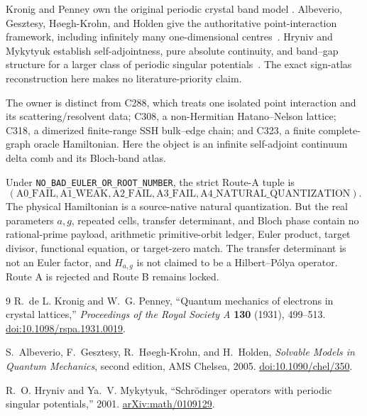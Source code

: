 \documentclass[10pt]{article}
\begin{document}
Kronig and Penney own the original periodic crystal band model
\cite{kronigpenney}.  Albeverio, Gesztesy, H\o egh-Krohn, and Holden give the
authoritative point-interaction framework, including infinitely many
one-dimensional centres~\cite{albeverio}.  Hryniv and Mykytyuk establish
self-adjointness, pure absolute continuity, and band--gap structure for a
larger class of periodic singular potentials~\cite{hryniv}.  The exact
sign-atlas reconstruction here makes no literature-priority claim.

The owner is distinct from C288, which treats one isolated point interaction
and its scattering/resolvent data; C308, a non-Hermitian Hatano--Nelson
lattice; C318, a dimerized finite-range SSH bulk--edge chain; and C323, a
finite complete-graph oracle Hamiltonian.  Here the object is an infinite
self-adjoint continuum delta comb and its Bloch-band atlas.

Under \texttt{NO\_BAD\_EULER\_OR\_ROOT\_NUMBER}, the strict Route-A tuple is
\[
 (\mathrm{A0\_FAIL},\mathrm{A1\_WEAK},\mathrm{A2\_FAIL},
  \mathrm{A3\_FAIL},\mathrm{A4\_NATURAL\_QUANTIZATION}).
\]
The physical Hamiltonian is a source-native natural quantization.  But the
real parameters $a,g$, repeated cells, transfer determinant, and Bloch phase
contain no rational-prime payload, arithmetic primitive-orbit ledger, Euler
product, target divisor, functional equation, or target-zero match.  The
transfer determinant is not an Euler factor, and $H_{a,g}$ is not claimed to
be a Hilbert--P\'olya operator.  Route A is rejected and Route B remains
locked.

\begingroup\small
\begin{thebibliography}{9}
R.~de L. Kronig and W.~G. Penney,
``Quantum mechanics of electrons in crystal lattices,''
\emph{Proceedings of the Royal Society A} \textbf{130} (1931), 499--513.
\href{https://doi.org/10.1098/rspa.1931.0019}{doi:10.1098/rspa.1931.0019}.

S.~Albeverio, F.~Gesztesy, R.~H\o egh-Krohn, and H.~Holden,
\emph{Solvable Models in Quantum Mechanics}, second edition,
AMS Chelsea, 2005.
\href{https://doi.org/10.1090/chel/350}{doi:10.1090/chel/350}.

R.~O. Hryniv and Ya.~V. Mykytyuk,
``Schr\"odinger operators with periodic singular potentials,'' 2001.
\href{https://arxiv.org/abs/math/0109129}{arXiv:math/0109129}.
\end{thebibliography}
\endgroup
\fi
\end{document}
